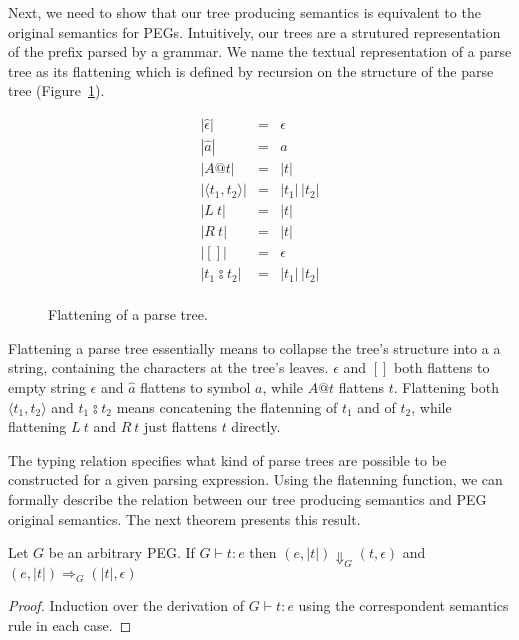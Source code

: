 Next, we need to show that our tree producing semantics is equivalent to
the original semantics for PEGs. Intuitively, our trees are a strutured
representation of the prefix parsed by a grammar. We name the textual
representation of a parse tree as its flattening which is defined
by recursion on the structure of the parse tree (Figure~\ref{fig:flattening-tree}).

\begin{figure}[H]
  \[
    \begin{array}{lcl}
      |\hat{\epsilon}| & = & \epsilon\\
      |\hat{a}| & = & a\\
      |A@t| & = & |t|\\
      |\langle t_1, t_2 \rangle| & = & |t_1|\,|t_2|\\
      |L\:t| & = & |t|\\
      |R\:t| & = & |t|\\
      |[]| & = & \epsilon \\
      |t_1  \typecolon  t_2| & = & |t_1|\,|t_2|\\
    \end{array}
  \]
  \centering
  \caption{Flattening of a parse tree.}
  \label{fig:flattening-tree}
\end{figure}

Flattening a parse tree essentially means to collapse the tree's structure into a 
a string, containing the characters at the tree's leaves. \(\hat{\epsilon}\) and
\([]\) both flattens to empty string \(\epsilon\) and \(\hat{a}\) flattens to 
symbol \(a\), while \(A@t\) flattens \(t\). Flattening both \(\langle t_1, t_2 
\rangle\) and \(t_1  \typecolon  t_2\) means concatening the flatenning of \(t_1\) 
and of \(t_2\), while flattening \(L\:t\) and \(R\:t\) just flattens \(t\) directly. 

The typing relation specifies what kind of parse trees are possible to be
constructed for a given parsing expression. Using the flatenning function,
we can formally describe the relation between our tree producing semantics
and PEG original semantics.
The next theorem presents this result.

\begin{theorem}
  Let $G$ be an arbitrary PEG. If $G \vdash t : e$ then $(e, |t|) \Downarrow_G (t, \epsilon)$ and
  $(e, |t|)\Rightarrow_G (|t|, \epsilon)$
\end{theorem}
\begin{proof}
  Induction over the derivation of $G \vdash t : e$ using the correspondent semantics rule in each case.
\end{proof}

